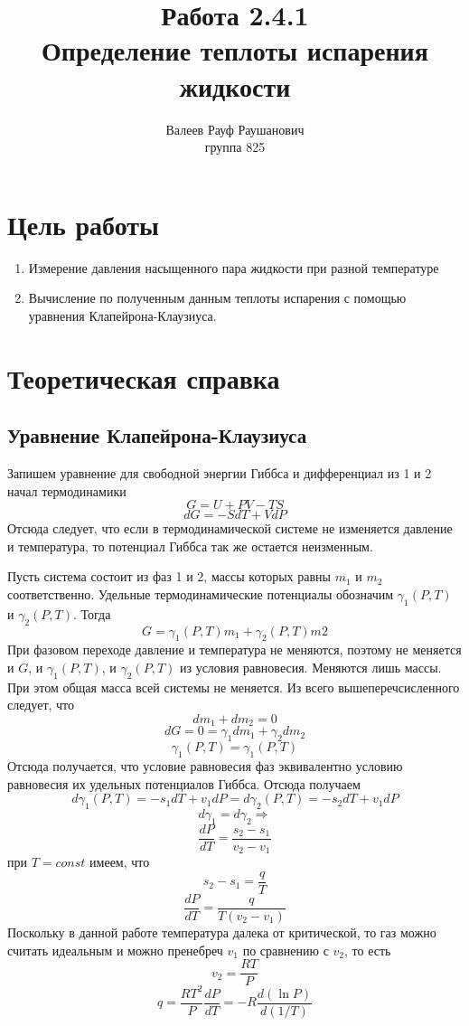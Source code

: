 \documentclass[a4paper, 12pt]{article}%
\author{Валеев Рауф Раушанович \\
группа 825}
\title{\textbf{Работа 2.4.1 \\ 
Определение теплоты испарения жидкости}}
\begin{document}
\maketitle
\section*{Цель работы}
\begin{enumerate}
\item Измерение давления насыщенного пара жидкости при разной температуре
\item Вычисление по полученным данным теплоты испарения с помощью уравнения Клапейрона-Клаузиуса.
\end{enumerate}
\section*{Теоретическая справка}
\subsection*{Уравнение Клапейрона-Клаузиуса}
Запишем уравнение для свободной энергии Гиббса и дифференциал из 1 и 2 начал термодинамики
\[G = U + PV - TS\]
\[dG = -SdT + VdP\]
Отсюда следует, что если в термодинамической системе не изменяется давление и температура, то потенциал Гиббса так же остается неизменным.

Пусть система состоит из фаз 1 и 2, массы которых равны $m_1$ и $m_2$ соответственно. Удельные термодинамические потенциалы обозначим $\gamma_1 (P, T)$ и $\gamma_2 (P, T)$. Тогда 
\[G = \gamma_1 (P, T) m_1 + \gamma_2 (P, T) m2\]
При фазовом переходе давление и температура не меняются, поэтому не меняется и $G$, и $\gamma_1 (P, T)$, и $\gamma_2 (P, T)$ из условия равновесия. Меняются лишь массы. При этом общая масса всей системы не меняется. Из всего вышеперечсисленного следует, что
\[dm_1 + dm_2 = 0\]
\[dG = 0 = \gamma_1 dm_1 + \gamma_2 dm_2\]
\[\gamma_1 (P, T) = \gamma_1 (P, T)\]
Отсюда получается, что условие равновесия фаз эквивалентно условию равновесия их удельных потенциалов Гиббса. Отсюда получаем
\[d \gamma_1 (P, T) =  -s_1 dT + v_1 dP = d \gamma_2 (P, T) = -s_2 dT + v_1 dP\]
\[d \gamma_1 = d \gamma_2 \Rightarrow\]
\[\dfrac{dP}{dT} = \dfrac{s_2 - s_1}{v_2 - v_1}\]
при $T = const$ имеем, что
\[s_2 - s_1 = \dfrac{q}{T}\]
\[\dfrac{dP}{dT} = \dfrac{q}{T(v_2 - v_1)}\]
Поскольку в данной работе температура далека от критической, то газ можно считать идеальным и можно пренебреч $v_1$ по сравнению с $v_2$, то есть 
\[v_2 = \dfrac{RT}{P}\]
\[q = \dfrac{RT^2}{ P} \dfrac{dP}{dT} = -R \dfrac{d(\ln P)}{d(1/T)}\]
\end{document}
